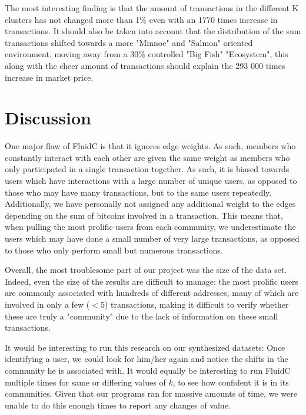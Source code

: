 \documentclass{article}
\begin{document}
\bigskip
\bigskip

The most interesting finding is that the amount of transactions
in the different K clusters has not changed more than 1\% even with an 1770 times increase in transactions.
It should also be taken into account that the distribution of the sum transactions shifted towards
a more "Minnoe" and "Salmon" oriented environment, moving away from a 30\% controlled "Big Fish" "Ecosystem",
this along with the cheer amount of transactions should explain the 293 000 times increase in market price.

\pagebreak
\section{Discussion}

One major flaw of FluidC is that it ignores edge weights. As such, members who constantly 
interact with each other are given the same weight as members who only participated in a 
single transaction together. As such, it is biased towards users which have interactions 
with a large number of unique users, as opposed to those who may have many transactions, 
but to the same users repeatedly. Additionally, we have personally not assigned any 
additional weight to the edges depending on the sum of bitcoins involved in a transaction. 
This means that, when pulling the most prolific users from each community, we underestimate 
the users which may have done a small number of very large transactions, as opposed to those 
who only perform small but numerous transactions.

Overall, the most troublesome part of our project was the size of the data set. 
Indeed, even the size of the results are difficult to manage: the most prolific users 
are commonly associated with hundreds of different addresses, many of which are involved 
in only a few ($<$5) transactions, making it difficult to verify whether these are truly a 
"community" due to the lack of information on these small transactions.

It would be interesting to run this research on our synthesized datasets: 
Once identifying a user, we could look for him/her again and notice the shifts in the community 
he is associated with. It would equally be interesting to run FluidC multiple times for 
same or differing values of $k$, to see how confident it is in its communities. 
Given that our programs ran for massive amounts of time, we were unable to 
do this enough times to report any changes of value.
\end{document}
